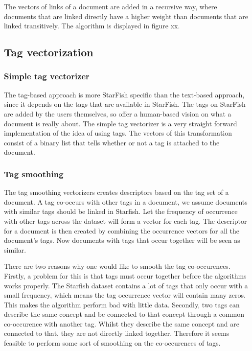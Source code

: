 The vectors of links of a document are added in a recursive way, where documents that are linked directly have a higher weight than documents that are linked transitively. The algorithm is displayed in figure xx.

\subsection{Tag vectorization}
\subsubsection{Simple tag vectorizer}
The tag-based approach is more StarFish specific than the text-based approach, since it depends on the tags that are available in StarFish. The tags on StarFish are added by the users themselves, so offer a human-based vision on what a document is really about. The simple tag vectorizer is a very straight forward implementation of the idea of using tags. The vectors of this transformation consist of a binary list that tells whether or not a tag is attached to the document. 

\subsubsection{Tag smoothing}
The tag smoothing vectorizers creates descriptors based on the tag set of a document. A tag co-occurs with other tags in a document, we assume documents with similar tags should be linked in Starfish. Let the frequency of occurrence with other tags across the dataset will form a vector for each tag. The descriptor for a document is then created by combining the occurrence vectors for all the document's tags. Now documents with tags that occur together will be seen as similar.

There are two reasons why one would like to smooth the tag co-occurences. Firstly, a problem for this is that tags must occur together before the algorithms works properly. The Starfish dataset contains a lot of tags that only occur with a small frequency, which means the tag occurrence vector will contain many zeros. This makes the algorithm perform bad with little data. Secondly, two tags can describe the same concept and be connected to that concept through a common co-occurence with another tag. Whilst they describe the same concept and are connected to that, they are not directly linked together. Therefore it seems feasible to perform some sort of smoothing on the co-occurences of tags.

